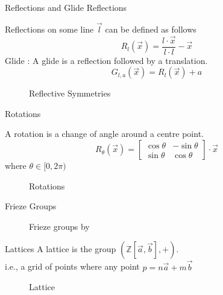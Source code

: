 \documentclass{beamer}
\begin{document}
\begin{frame}{Reflections and Glide Reflections}
    \begin{center}  
        Reflections on some line $\vec{l}$ can be defined as follows
        \[R_{l}(\vec{x})= \frac{l\cdot \vec{x}}{l\cdot l}-\vec{x}\] 
        Glide : A glide is a reflection followed by a translation. 
        \[G_{l,a}(\vec{x})=R_l(\vec{x})+a\]\cite{Angela:2023}
    \end{center}
    \begin{figure}
        \centering
        
        \caption{Reflective Symmetries}
        \label{fig:symmetries}
    \end{figure}
\end{frame}

\begin{frame}{Rotations}
    \begin{center}
        A rotation is a change of angle around a centre point.
        \[R_\theta(\vec{x}) = \begin{bmatrix}
            \cos\theta & -\sin\theta\\
            \sin\theta & \cos\theta
        \end{bmatrix}\cdot\vec{x}\] 
        where $\theta \in [0,2\pi)$
        \cite{Angela:2023}
    \end{center}
    \begin{figure}
        \centering
        
        \caption{Rotations}
        \label{fig:enter-label}
    \end{figure}
\end{frame}

\begin{frame}{Frieze Groups}
    \begin{figure}
        \centering
        
        \caption{Frieze groups by \cite{Tomruen:2015}}
        \label{fig:Freize}
    \end{figure}
\end{frame}

\begin{frame}{Lattices}
        A lattice is the group $(\mathbb{Z}[\Vec{a},\Vec{b}],+).$\\
        i.e., a grid of points where any point $p = n\Vec{a} +m\Vec{b}$ 
    \begin{figure}
        \centering
        \scalebox{0.5}{}
        \caption{Lattice}
        \label{fig:enter-label}
    \end{figure}
\end{frame}
\end{document}
